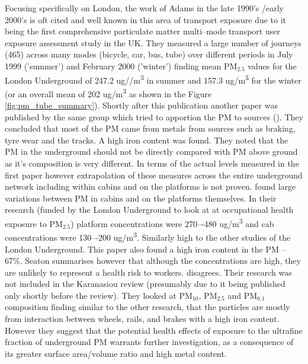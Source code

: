 Focusing specifically on London, the work of Adams in the late 1990's \slash early 2000's is oft cited and well known in this area of transport exposure due to it being the first comprehensive particulate matter multi--mode transport user exposure assessment study in the UK. They measured a large number of journeys (465) across many modes (bicycle, car, bus, tube) over different periods in July 1999 ('summer') and February 2000 ('winter') finding mean PM$_{2.5}$ values for the London Underground of 247.2 ug\slash /m\textsuperscript{3} in summer and 157.3 ug\slash m\textsuperscript{3} for the winter (or an overall mean of 202 ug\slash m\textsuperscript{3} as shown in the Figure \ref{fig:pm_tube_summary}). Shortly after this publication another paper was published by the same group which tried to apportion the PM to sources (\cite{Adams2001a}). They concluded that most of the PM came from metals from sources such as braking, tyre wear and the tracks. A high iron content was found. They noted that the PM in the underground should not be directly compared with PM above ground as it's composition is very different. In terms of the actual levels measured in the first paper however extrapolation of these measures across the entire underground network including within cabins and on the platforms is not proven. \cite{Seaton2005} found large variations between PM in cabins and on the platforms themselves. In their research (funded by the London Underground to look at at occupational health exposure to PM$_{2.5}$) platform concentrations were 270–-480 ug\slash m\textsuperscript{3} and cab concentrations were 130–-200 ug\slash m\textsuperscript{3}. Similarly high to the other studies of the London Underground. This paper also found a high iron content in the PM -- 67\%. Seaton summarises however that although the concentrations are high, they are unlikely to represent a health risk to workers. \cite{Loxham2013} disagrees. Their research was not included in the Karanasiou review (presumably due to it being published only shortly before the review). They looked at PM$_{10}$, PM$_{2.5}$ and PM$_{0.1}$ composition finding similar to the other research, that the particles are mostly from interaction between wheels, rails, and brakes with a high iron content. However they suggest that the potential health effects of exposure to the ultrafine fraction of underground PM warrants further investigation, as a consequence of its greater surface area/volume ratio and high metal content.


